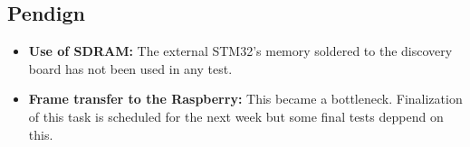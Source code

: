 \subsection{Pendign}

\begin{itemize}
	\item \textbf{Use of SDRAM:} The external STM32's memory soldered to the discovery board has not been used in any test.
	\item \textbf{Frame transfer to the Raspberry:} This became a bottleneck. Finalization of this task is scheduled for the next week but some final tests deppend on this.
\end{itemize}
